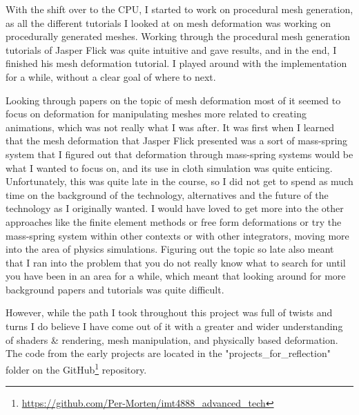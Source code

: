 With the shift over to the CPU, I started to work on procedural mesh generation, as all the different tutorials I looked at
on mesh deformation was working on procedurally generated meshes. Working through the procedural mesh generation tutorials
of Jasper Flick was quite intuitive and gave results, and in the end, I finished his mesh deformation tutorial.
I played around with the implementation for a while, without a clear goal of where to next.

Looking through papers on the topic of mesh deformation most of it seemed to focus on deformation for manipulating meshes more related to creating animations,
which was not really what I was after. 
It was first when I learned that the mesh deformation that Jasper Flick\cite{catlike_mesh_deformation} presented was a sort of mass-spring system
that I figured out that deformation through mass-spring systems would be what I wanted to focus on, and its use in cloth simulation was quite enticing.
Unfortunately, this was quite late in the course, so I did not get to spend as much time on the background of the technology, alternatives
and the future of the technology as I originally wanted.
I would have loved to get more into the other approaches like the finite element methods or free form deformations or try the mass-spring system
within other contexts or with other integrators, moving more into the area of physics simulations.
Figuring out the topic so late also meant that I ran into the problem that you do not really know what to search for until you have been in an area for a while,
which meant that looking around for more background papers and tutorials was quite difficult.

However, while the path I took throughout this project was full of twists and turns I do believe I have come out of it with a greater and wider understanding of
shaders \& rendering, mesh manipulation, and physically based deformation.
The code from the early projects are located in the "projects\_for\_reflection" folder on the GitHub\footnote{\url{https://github.com/Per-Morten/imt4888_advanced_tech}} repository.
